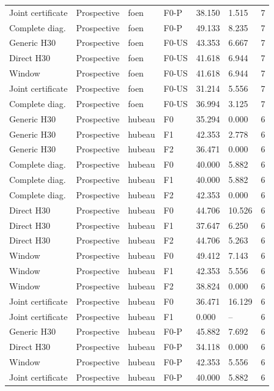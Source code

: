 {\begin{longtable}{p{}p{}p{}p{}p{}p{}p{}}
Joint certificate & Prospective & foen & F0-P & 38.150 & 1.515 & 7 \\
Complete diag. & Prospective & foen & F0-P & 49.133 & 8.235 & 7 \\
Generic H30 & Prospective & foen & F0-US & 43.353 & 6.667 & 7 \\
Direct H30 & Prospective & foen & F0-US & 41.618 & 6.944 & 7 \\
Window & Prospective & foen & F0-US & 41.618 & 6.944 & 7 \\
Joint certificate & Prospective & foen & F0-US & 31.214 & 5.556 & 7 \\
Complete diag. & Prospective & foen & F0-US & 36.994 & 3.125 & 7 \\
Generic H30 & Prospective & hubeau & F0 & 35.294 & 0.000 & 6 \\
Generic H30 & Prospective & hubeau & F1 & 42.353 & 2.778 & 6 \\
Generic H30 & Prospective & hubeau & F2 & 36.471 & 0.000 & 6 \\
Complete diag. & Prospective & hubeau & F0 & 40.000 & 5.882 & 6 \\
Complete diag. & Prospective & hubeau & F1 & 40.000 & 5.882 & 6 \\
Complete diag. & Prospective & hubeau & F2 & 42.353 & 0.000 & 6 \\
Direct H30 & Prospective & hubeau & F0 & 44.706 & 10.526 & 6 \\
Direct H30 & Prospective & hubeau & F1 & 37.647 & 6.250 & 6 \\
Direct H30 & Prospective & hubeau & F2 & 44.706 & 5.263 & 6 \\
Window & Prospective & hubeau & F0 & 49.412 & 7.143 & 6 \\
Window & Prospective & hubeau & F1 & 42.353 & 5.556 & 6 \\
Window & Prospective & hubeau & F2 & 38.824 & 0.000 & 6 \\
Joint certificate & Prospective & hubeau & F0 & 36.471 & 16.129 & 6 \\
Joint certificate & Prospective & hubeau & F1 & 0.000 & -- & 6 \\
Generic H30 & Prospective & hubeau & F0-P & 45.882 & 7.692 & 6 \\
Direct H30 & Prospective & hubeau & F0-P & 34.118 & 0.000 & 6 \\
Window & Prospective & hubeau & F0-P & 42.353 & 5.556 & 6 \\
Joint certificate & Prospective & hubeau & F0-P & 40.000 & 5.882 & 6 \\

\end{longtable}}
